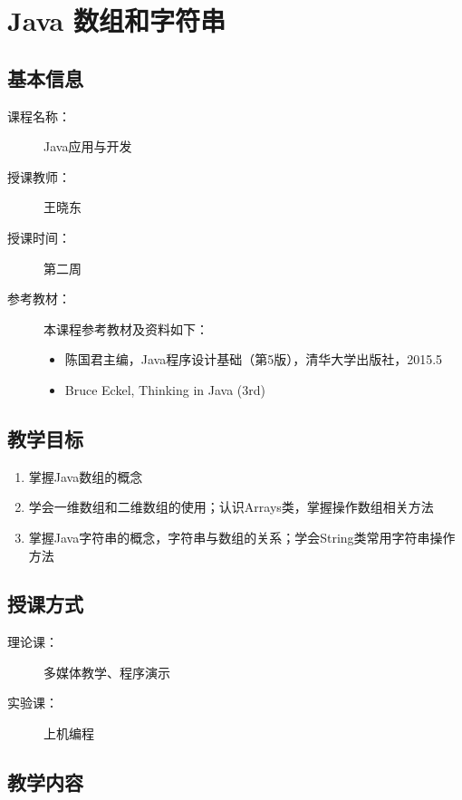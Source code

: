 \chapter{Java 数组和字符串}
\label{chp:Java-array-and-string}

\section*{基本信息}
\sline
\begin{description}
\item[课程名称：] Java应用与开发
\item[授课教师：] 王晓东
\item[授课时间：] 第二周
\item[参考教材：] 本课程参考教材及资料如下：
  \begin{itemize}
  \item 陈国君主编，Java程序设计基础（第5版），清华大学出版社，2015.5
  \item Bruce Eckel, Thinking in Java (3rd)
  \end{itemize}
\end{description}

\section*{教学目标}

\sline

\begin{enumerate}
\item 掌握Java数组的概念
\item 学会一维数组和二维数组的使用；认识Arrays类，掌握操作数组相关方法
\item 掌握Java字符串的概念，字符串与数组的关系；学会String类常用字符串操作方法
\end{enumerate}

\section*{授课方式}

\sline
\begin{description}
\item[理论课：] 多媒体教学、程序演示
\item[实验课：] 上机编程
\end{description}

\newpage
\section*{教学内容}
\sline

